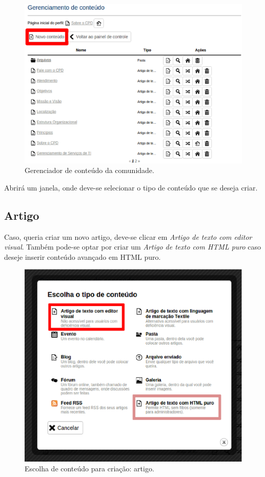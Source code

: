 \begin{figure}[H]
  \centering
    \includegraphics[keepaspectratio=true,scale=0.49]{figuras/novoConteudo.eps}
  \caption{Gerenciador de conteúdo da comunidade.}
  \label{fig:novoConteudo}
\end{figure}

Abrirá um janela, onde deve-se selecionar o tipo de conteúdo que se deseja criar. 

\subsection{Artigo}
\label{subsec:artigo}

Caso, queria criar um novo artigo, deve-se clicar em \emph{Artigo de texto com editor visual}. Também pode-se optar por criar um \emph{Artigo de texto com HTML puro} caso deseje inserir conteúdo avançado em HTML puro.

\begin{figure}[H]
  \centering
    \includegraphics[keepaspectratio=true,scale=0.49]{figuras/criandoArtigo.eps}
  \caption{Escolha de conteúdo para criação: artigo.}
  \label{fig:FormCriacaoPasta}
\end{figure}

